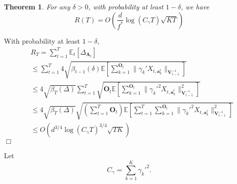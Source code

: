 \documentclass{article}
\newcommand{\EE}{\mathbb{E}}
\newcommand{\bA}{\mathbf{A}}
\newcommand{\ba}{\mathbf{a}}
\newcommand{\bO}{\mathbf{O}}
\newcommand{\bV}{\mathbf{V}}
\newcommand{\norm}[1]{\| #1 \|}
\newtheorem{theorem}{Theorem}[section]
\newenvironment{proof}{\noindent {\textbf{Proof. }}}{$\Box$ \medskip}
\begin{document}
\begin{theorem}
For any $\delta > 0$, with probability at least $1 - \delta$, we have
\begin{equation}
R(T) = O(\frac{d}{f^*}\log(C_\gamma T)\sqrt{KT})
\end{equation}
\end{theorem}
\begin{proof}
With probability at least $1-\delta$,
\begin{equation}
\begin{split}
&R_T =\sum_{t=1}^{T} \EE_{t}[\Delta_{\bA_t}] \\
&\leq \sum_{t=1}^{T} 4 \sqrt{\beta_{t-1}(\delta) \EE[\sum_{k=1}^{\bO_t}\norm{\gamma_k' X_{t,\ba_k^t}}_{\bV_{t-1}^{-1}}]}\\
&\leq 4\sqrt{\beta_T(\Delta)} \sum_{t=1}^{T} \sqrt{\bO_t \EE[\sum_{k=1}^{\bO_t}\norm{\gamma_k'^2 X_{t,\ba_k^t}}_{\bV_{t-1}^{-1}}^2]}\\
&\leq 4\sqrt{\beta_T(\Delta)} \sqrt{(\sum_{t=1}^{T} \bO_t) \EE[\sum_{t=1}^{T} \sum_{k=1}^{\bO_t}\norm{\gamma_k'^2 X_{t,\ba_k^t}}_{\bV_{t-1}^{-1}}^2]}  \\
&\leq O(d^{3/4}\log(C_\gamma T)^{3/4}\sqrt{TK})
\end{split}
\end{equation}
\end{proof}

Let
\begin{equation}
C_\gamma = \sum_{k=1}^{K} \gamma_k'^2.
\end{equation}
	
\end{document}
